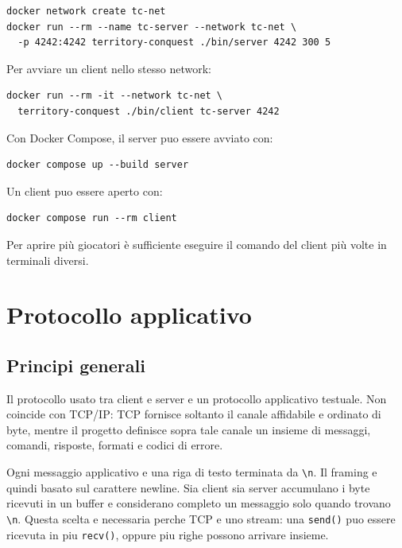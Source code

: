 \documentclass[11pt,a4paper]{article}
\begin{document}
\begin{lstlisting}[style=textstyle]
docker network create tc-net
docker run --rm --name tc-server --network tc-net \
  -p 4242:4242 territory-conquest ./bin/server 4242 300 5
\end{lstlisting}

Per avviare un client nello stesso network:

\begin{lstlisting}[style=textstyle]
docker run --rm -it --network tc-net \
  territory-conquest ./bin/client tc-server 4242
\end{lstlisting}

Con Docker Compose, il server puo essere avviato con:

\begin{lstlisting}[style=textstyle]
docker compose up --build server
\end{lstlisting}

Un client puo essere aperto con:

\begin{lstlisting}[style=textstyle]
docker compose run --rm client
\end{lstlisting}

Per aprire più giocatori è sufficiente eseguire il comando del client più volte in terminali diversi.

\section{Protocollo applicativo}

\subsection{Principi generali}

Il protocollo usato tra client e server e un protocollo applicativo testuale. Non coincide con TCP/IP: TCP fornisce soltanto il canale affidabile e ordinato di byte, mentre il progetto definisce sopra tale canale un insieme di messaggi, comandi, risposte, formati e codici di errore.

Ogni messaggio applicativo e una riga di testo terminata da \texttt{\textbackslash n}. Il framing e quindi basato sul carattere newline. Sia client sia server accumulano i byte ricevuti in un buffer e considerano completo un messaggio solo quando trovano \texttt{\textbackslash n}. Questa scelta e necessaria perche TCP e uno stream: una \texttt{send()} puo essere ricevuta in piu \texttt{recv()}, oppure piu righe possono arrivare insieme.
\end{document}
